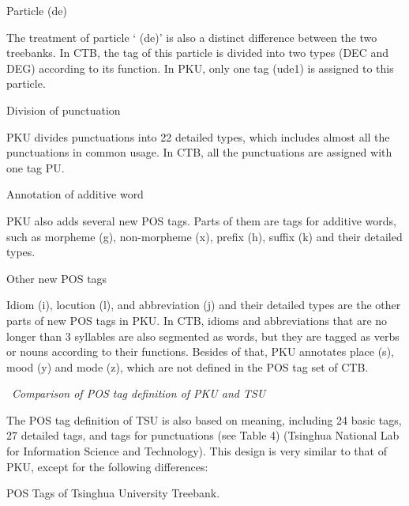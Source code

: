 \documentclass[english]{jnlp_1.4}
\renewcommand{\subsubsection}{}
\begin{document}
\subsubsection{Particle  (de)}

The treatment of particle ` (de)' is also a distinct difference 
between the two treebanks. In CTB, the tag of this particle is divided into 
two types (DEC and DEG) according to its function. In PKU, only one tag 
(ude1) is assigned to this particle.

\subsubsection{Division of punctuation}

PKU divides punctuations into 22 detailed types, which includes almost all 
the punctuations in common usage. In CTB, all the punctuations are assigned 
with one tag PU.

\subsubsection{Annotation of additive word}

PKU also adds several new POS tags. Parts of them are tags for additive 
words, such as morpheme (g), non-morpheme (x), prefix (h), suffix (k) and 
their detailed types.

\subsubsection{Other new POS tags }

Idiom (i), locution (l), and abbreviation (j) and their detailed types are 
the other parts of new POS tags in PKU. In CTB, idioms and abbreviations 
that are no longer than 3 syllables are also segmented as words, but they 
are tagged as verbs or nouns according to their functions. Besides of that, 
PKU annotates place (s), mood (y) and mode (z), which are not defined in the 
POS tag set of CTB.


\noindent
\textendash\ \textit{Comparison of POS tag definition of PKU and TSU}

The POS tag definition of TSU is also based on meaning, including 24 basic 
tags, 27 detailed tags, and tags for punctuations (see Table 4) (Tsinghua 
National Lab for Information Science and Technology). This design is very 
similar to that of PKU, except for the following differences:

\begin{table}[t]
\caption{POS Tags of Tsinghua University Treebank.}

\end{table}
\end{document}
